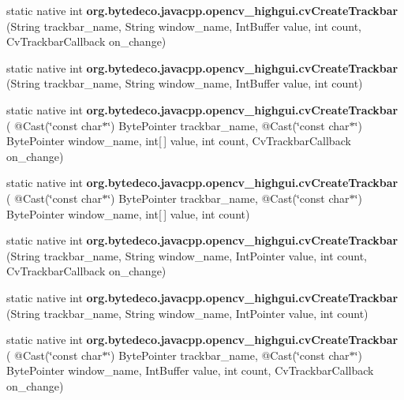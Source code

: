 \begin{DoxyCompactItemize}
static native int {\bfseries org.\+bytedeco.\+javacpp.\+opencv\+\_\+highgui.\+cv\+Create\+Trackbar} (String trackbar\+\_\+name, String window\+\_\+name, Int\+Buffer value, int count, Cv\+Trackbar\+Callback on\+\_\+change)
\item 
\mbox{\label{group__highgui__c_ga2716c8b2ed9a7f70f4ef4c6fb432d56c}} 
static native int {\bfseries org.\+bytedeco.\+javacpp.\+opencv\+\_\+highgui.\+cv\+Create\+Trackbar} (String trackbar\+\_\+name, String window\+\_\+name, Int\+Buffer value, int count)
\item 
\mbox{\label{group__highgui__c_ga76eba478cd3b0b1621cd657dc23ae059}} 
static native int {\bfseries org.\+bytedeco.\+javacpp.\+opencv\+\_\+highgui.\+cv\+Create\+Trackbar} ( @Cast(\char`\"{}const char$\ast$\char`\"{}) Byte\+Pointer trackbar\+\_\+name, @Cast(\char`\"{}const char$\ast$\char`\"{}) Byte\+Pointer window\+\_\+name, int\mbox{[}$\,$\mbox{]} value, int count, Cv\+Trackbar\+Callback on\+\_\+change)
\item 
\mbox{\label{group__highgui__c_ga4c827a7c11f752c595f36c9da6e52464}} 
static native int {\bfseries org.\+bytedeco.\+javacpp.\+opencv\+\_\+highgui.\+cv\+Create\+Trackbar} ( @Cast(\char`\"{}const char$\ast$\char`\"{}) Byte\+Pointer trackbar\+\_\+name, @Cast(\char`\"{}const char$\ast$\char`\"{}) Byte\+Pointer window\+\_\+name, int\mbox{[}$\,$\mbox{]} value, int count)
\item 
\mbox{\label{group__highgui__c_ga536fc822a16d07dc91ba127f127ee2d4}} 
static native int {\bfseries org.\+bytedeco.\+javacpp.\+opencv\+\_\+highgui.\+cv\+Create\+Trackbar} (String trackbar\+\_\+name, String window\+\_\+name, Int\+Pointer value, int count, Cv\+Trackbar\+Callback on\+\_\+change)
\item 
\mbox{\label{group__highgui__c_gab1727cfb769c68604abbd8102b8d818c}} 
static native int {\bfseries org.\+bytedeco.\+javacpp.\+opencv\+\_\+highgui.\+cv\+Create\+Trackbar} (String trackbar\+\_\+name, String window\+\_\+name, Int\+Pointer value, int count)
\item 
\mbox{\label{group__highgui__c_gaca9f5c6365c4991a0dc81e6872cee02f}} 
static native int {\bfseries org.\+bytedeco.\+javacpp.\+opencv\+\_\+highgui.\+cv\+Create\+Trackbar} ( @Cast(\char`\"{}const char$\ast$\char`\"{}) Byte\+Pointer trackbar\+\_\+name, @Cast(\char`\"{}const char$\ast$\char`\"{}) Byte\+Pointer window\+\_\+name, Int\+Buffer value, int count, Cv\+Trackbar\+Callback on\+\_\+change)

\end{DoxyCompactItemize}
